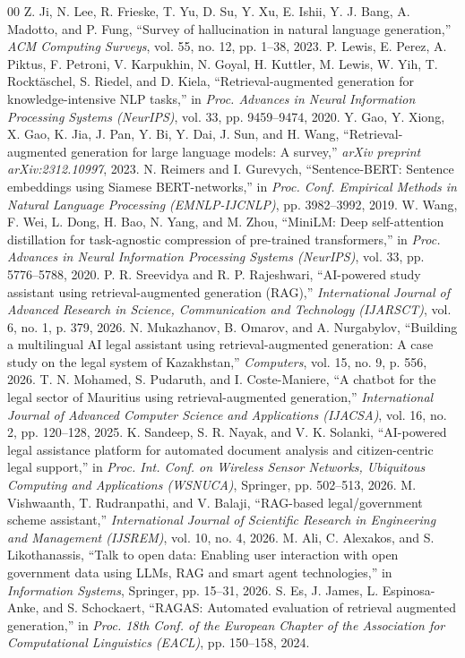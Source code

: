 \documentclass[conference]{IEEEtran}
\begin{document}
\begin{thebibliography}{00}
 Z. Ji, N. Lee, R. Frieske, T. Yu, D. Su, Y. Xu, E. Ishii, Y. J. Bang, A. Madotto, and P. Fung, ``Survey of hallucination in natural language generation,'' \textit{ACM Computing Surveys}, vol. 55, no. 12, pp. 1--38, 2023.
 P. Lewis, E. Perez, A. Piktus, F. Petroni, V. Karpukhin, N. Goyal, H. Kuttler, M. Lewis, W. Yih, T. Rockt{\"a}schel, S. Riedel, and D. Kiela, ``Retrieval-augmented generation for knowledge-intensive NLP tasks,'' in \textit{Proc. Advances in Neural Information Processing Systems (NeurIPS)}, vol. 33, pp. 9459--9474, 2020.
 Y. Gao, Y. Xiong, X. Gao, K. Jia, J. Pan, Y. Bi, Y. Dai, J. Sun, and H. Wang, ``Retrieval-augmented generation for large language models: A survey,'' \textit{arXiv preprint arXiv:2312.10997}, 2023.
 N. Reimers and I. Gurevych, ``Sentence-BERT: Sentence embeddings using Siamese BERT-networks,'' in \textit{Proc. Conf. Empirical Methods in Natural Language Processing (EMNLP-IJCNLP)}, pp. 3982--3992, 2019.
 W. Wang, F. Wei, L. Dong, H. Bao, N. Yang, and M. Zhou, ``MiniLM: Deep self-attention distillation for task-agnostic compression of pre-trained transformers,'' in \textit{Proc. Advances in Neural Information Processing Systems (NeurIPS)}, vol. 33, pp. 5776--5788, 2020.
 P. R. Sreevidya and R. P. Rajeshwari, ``AI-powered study assistant using retrieval-augmented generation (RAG),'' \textit{International Journal of Advanced Research in Science, Communication and Technology (IJARSCT)}, vol. 6, no. 1, p. 379, 2026.
 N. Mukazhanov, B. Omarov, and A. Nurgabylov, ``Building a multilingual AI legal assistant using retrieval-augmented generation: A case study on the legal system of Kazakhstan,'' \textit{Computers}, vol. 15, no. 9, p. 556, 2026.
 T. N. Mohamed, S. Pudaruth, and I. Coste-Maniere, ``A chatbot for the legal sector of Mauritius using retrieval-augmented generation,'' \textit{International Journal of Advanced Computer Science and Applications (IJACSA)}, vol. 16, no. 2, pp. 120--128, 2025.
 K. Sandeep, S. R. Nayak, and V. K. Solanki, ``AI-powered legal assistance platform for automated document analysis and citizen-centric legal support,'' in \textit{Proc. Int. Conf. on Wireless Sensor Networks, Ubiquitous Computing and Applications (WSNUCA)}, Springer, pp. 502--513, 2026.
 M. Vishwaanth, T. Rudranpathi, and V. Balaji, ``RAG-based legal/government scheme assistant,'' \textit{International Journal of Scientific Research in Engineering and Management (IJSREM)}, vol. 10, no. 4, 2026.
 M. Ali, C. Alexakos, and S. Likothanassis, ``Talk to open data: Enabling user interaction with open government data using LLMs, RAG and smart agent technologies,'' in \textit{Information Systems}, Springer, pp. 15--31, 2026.
 S. Es, J. James, L. Espinosa-Anke, and S. Schockaert, ``RAGAS: Automated evaluation of retrieval augmented generation,'' in \textit{Proc. 18th Conf. of the European Chapter of the Association for Computational Linguistics (EACL)}, pp. 150--158, 2024.
\end{thebibliography}
\end{document}
